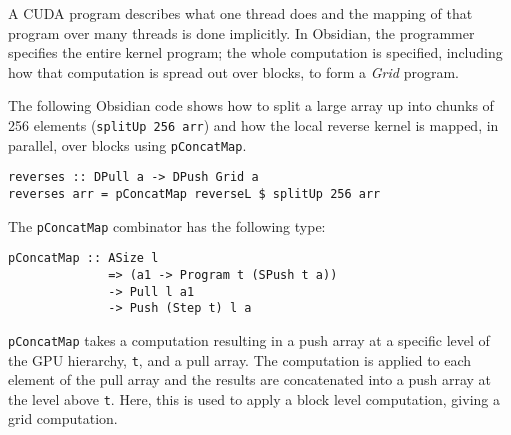 

A CUDA program describes what one thread does and the mapping of that 
program over many threads is done implicitly.
In Obsidian, the programmer specifies the entire kernel
program;  the whole computation is specified, including how that computation 
is spread out over blocks, to form a {\em Grid} program. 

The following Obsidian code shows how to split a large array up into 
chunks of 256 elements ({\tt splitUp 256 arr}) and how the local reverse 
kernel is mapped, in parallel, over blocks using {\tt pConcatMap}. 

\begin{small} 
\begin{verbatim} 
reverses :: DPull a -> DPush Grid a
reverses arr = pConcatMap reverseL $ splitUp 256 arr 
\end{verbatim} 
\end{small} 

\noindent
The {\tt pConcatMap} combinator has the following type: 
\begin{small}
\begin{Verbatim}[samepage=true] 
pConcatMap :: ASize l 
              => (a1 -> Program t (SPush t a)) 
              -> Pull l a1 
              -> Push (Step t) l a
\end{Verbatim}
\end{small}

{\tt pConcatMap} takes a computation resulting in a push array at a specific 
level of the GPU hierarchy, {\tt t}, and a pull array. The computation 
is applied to each element of the pull array and the results are concatenated 
into a push array at the level above {\tt t}. Here, this is used to apply a block 
level computation, giving a grid computation. 

